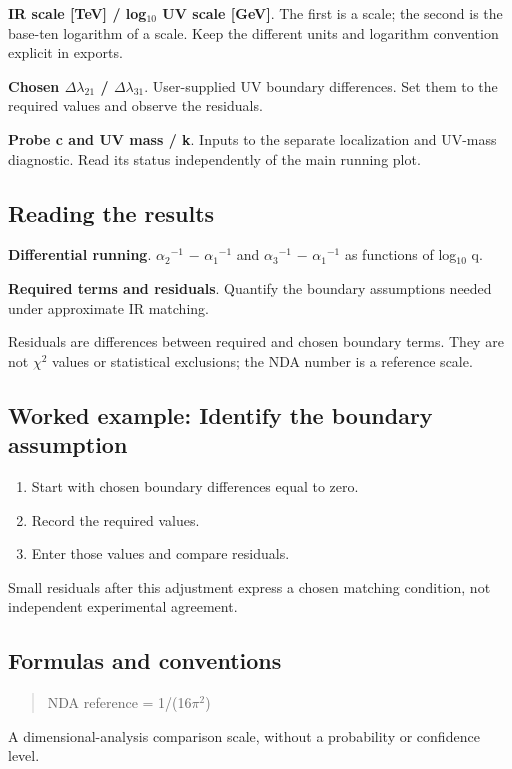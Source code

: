 \documentclass[11pt,a4paper]{article}
\begin{document}
\textbf{IR scale [TeV] / log\ensuremath{{}_{10}} UV scale [GeV]}. The first is a scale; the second is the base-ten logarithm of a scale. Keep the different units and logarithm convention explicit in exports.

\textbf{Chosen \ensuremath{\Delta}\ensuremath{\lambda}\ensuremath{{}_{21}} / \ensuremath{\Delta}\ensuremath{\lambda}\ensuremath{{}_{31}}}. User-supplied UV boundary differences. Set them to the required values and observe the residuals.

\textbf{Probe c and UV mass / k}. Inputs to the separate localization and UV-mass diagnostic. Read its status independently of the main running plot.

\subsection*{Reading the results}
\textbf{Differential running}. \ensuremath{\alpha}\ensuremath{{}_{2}}\ensuremath{{}^{-1}} \ensuremath{-} \ensuremath{\alpha}\ensuremath{{}_{1}}\ensuremath{{}^{-1}} and \ensuremath{\alpha}\ensuremath{{}_{3}}\ensuremath{{}^{-1}} \ensuremath{-} \ensuremath{\alpha}\ensuremath{{}_{1}}\ensuremath{{}^{-1}} as functions of log\ensuremath{{}_{10}} q.

\textbf{Required terms and residuals}. Quantify the boundary assumptions needed under approximate IR matching.

Residuals are differences between required and chosen boundary terms. They are not \ensuremath{\chi}\ensuremath{{}^{2}} values or statistical exclusions; the NDA number is a reference scale.
\subsection*{Worked example: Identify the boundary assumption}
\begin{enumerate}
\item Start with chosen boundary differences equal to zero.
\item Record the required values.
\item Enter those values and compare residuals.
\end{enumerate}
Small residuals after this adjustment express a chosen matching condition, not independent experimental agreement.
\subsection*{Formulas and conventions}
\begin{quote}NDA reference = 1/(16\ensuremath{\pi}\ensuremath{{}^{2}})\end{quote}
A dimensional-analysis comparison scale, without a probability or confidence level.
\end{document}
